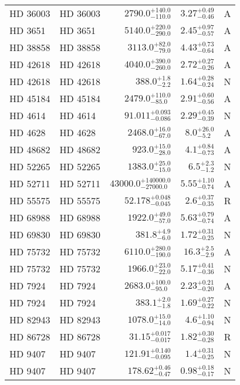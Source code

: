 \begin{longtable*}{llrrr}
HD 36003 & HD 36003 & $2790.0^{+140.0}_{-110.0}$ & $3.27^{+0.49}_{-0.46}$ & A \\ 
HD 3651 & HD 3651 & $5140.0^{+220.0}_{-290.0}$ & $2.45^{+0.97}_{-0.57}$ & A \\ 
HD 38858 & HD 38858 & $3113.0^{+82.0}_{-79.0}$ & $4.43^{+0.73}_{-0.64}$ & A \\ 
HD 42618 & HD 42618 & $4040.0^{+390.0}_{-260.0}$ & $2.72^{+0.27}_{-0.26}$ & A \\ 
HD 42618 & HD 42618 & $388.0^{+1.8}_{-2.2}$ & $1.64^{+0.28}_{-0.24}$ & N \\ 
HD 45184 & HD 45184 & $2479.0^{+110.0}_{-85.0}$ & $2.91^{+0.60}_{-0.56}$ & A \\ 
HD 4614 & HD 4614 & $91.011^{+0.093}_{-0.086}$ & $2.29^{+0.45}_{-0.39}$ & N \\ 
HD 4628 & HD 4628 & $2468.0^{+16.0}_{-67.0}$ & $8.0^{+26.0}_{-5.2}$ & A \\ 
HD 48682 & HD 48682 & $923.0^{+15.0}_{-28.0}$ & $4.1^{+0.84}_{-0.73}$ & A \\ 
HD 52265 & HD 52265 & $1383.0^{+25.0}_{-15.0}$ & $6.5^{+2.3}_{-1.2}$ & N \\ 
HD 52711 & HD 52711 & $43000.0^{+140000.0}_{-27000.0}$ & $5.55^{+1.10}_{-0.74}$ & A \\ 
HD 55575 & HD 55575 & $52.178^{+0.048}_{-0.045}$ & $2.6^{+0.37}_{-0.35}$ & R \\ 
HD 68988 & HD 68988 & $1922.0^{+49.0}_{-57.0}$ & $5.63^{+0.79}_{-0.74}$ & A \\ 
HD 69830 & HD 69830 & $381.8^{+4.9}_{-6.0}$ & $1.72^{+0.31}_{-0.25}$ & N \\ 
HD 75732 & HD 75732 & $6110.0^{+280.0}_{-190.0}$ & $16.3^{+2.5}_{-2.9}$ & A \\ 
HD 75732 & HD 75732 & $1966.0^{+23.0}_{-22.0}$ & $5.17^{+0.41}_{-0.36}$ & N \\ 
HD 7924 & HD 7924 & $2683.0^{+100.0}_{-95.0}$ & $2.23^{+0.21}_{-0.20}$ & A \\ 
HD 7924 & HD 7924 & $383.1^{+2.0}_{-1.8}$ & $1.69^{+0.27}_{-0.22}$ & N \\ 
HD 82943 & HD 82943 & $1078.0^{+15.0}_{-14.0}$ & $4.6^{+1.10}_{-0.94}$ & N \\ 
HD 86728 & HD 86728 & $31.15^{+0.017}_{-0.017}$ & $1.82^{+0.30}_{-0.28}$ & R \\ 
HD 9407 & HD 9407 & $121.91^{+0.140}_{-0.095}$ & $1.4^{+0.31}_{-0.25}$ & N \\ 
HD 9407 & HD 9407 & $178.62^{+0.46}_{-0.47}$ & $0.98^{+0.18}_{-0.17}$ & N \\ 

\end{longtable*}

